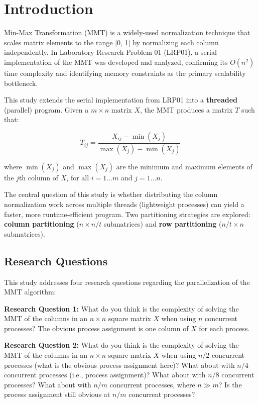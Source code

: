 \documentclass[journal]{IEEEtran}
\title{\SPTITLE}
\author{\AUTHORA%
\REMARK
}
\begin{document}
\maketitle

\section{Introduction}

 Min-Max Transformation (MMT) is a widely-used normalization technique that scales matrix elements to the range [0, 1] by normalizing each column independently. In Laboratory Research Problem 01 (LRP01), a serial implementation of the MMT was developed and analyzed, confirming its $O(n^2)$ time complexity and identifying memory constraints as the primary scalability bottleneck.

This study extends the serial implementation from LRP01 into a \textbf{threaded} (parallel) program. Given a $m \times n$ matrix $X$, the MMT produces a matrix $T$ such that:

\begin{equation}
T_{ij} = \frac{X_{ij} - \min(X_j)}{\max(X_j) - \min(X_j)}
\end{equation}

where $\min(X_j)$ and $\max(X_j)$ are the minimum and maximum elements of the $j$th column of $X$, for all $i = 1...m$ and $j = 1...n$.

The central question of this study is whether distributing the column normalization work across multiple threads (lightweight processes) can yield a faster, more runtime-efficient program. Two partitioning strategies are explored: \textbf{column partitioning} ($n \times n/t$ submatrices) and \textbf{row partitioning} ($n/t \times n$ submatrices).

\subsection{Research Questions}

This study addresses four research questions regarding the parallelization of the MMT algorithm:

\noindent\textbf{Research Question 1:} What do you think is the complexity of solving the MMT of the columns in an $n \times n$ square matrix $X$ when using $n$ concurrent processes? The obvious process assignment is one column of $X$ for each process.

\noindent\textbf{Research Question 2:} What do you think is the complexity of solving the MMT of the columns in an $n \times n$ square matrix $X$ when using $n/2$ concurrent processes (what is the obvious process assignment here)? What about with $n/4$ concurrent processes (i.e., process assignment)? What about with $n/8$ concurrent processes? What about with $n/m$ concurrent processes, where $n \gg m$? Is the process assignment still obvious at $n/m$ concurrent processes?
\end{document}

